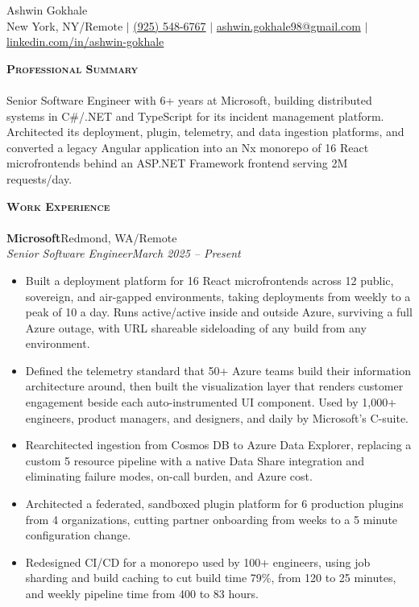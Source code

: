 \documentclass[letterpaper, 10pt]{article}
\newcommand{\lineunder}{
    \vspace*{-8pt} \\
    \hspace*{-18pt} \hrulefill \\
}
\newcommand{\header}[1]{
    \vspace*{10pt}
    {
        \hspace*{-18pt}\vspace*{4pt}
        {\large\textbf{\textsc{#1}}}
    }
    \vspace*{-6pt} \lineunder
}
\newcommand{\contact}[2]{
    \vspace*{-32pt}
    \begin{center}
        {\Huge #1}
        \vspace*{5pt}
        \\
        #2
    \end{center}
    \vspace*{-10pt}
}
\newcommand{\company}[2]{
    \textbf{#1}\hfill #2\\[0pt]
}
\newcommand{\role}[2]{
    \Needspace{5\baselineskip}
    \textit{#1}\hfill \textit{#2}\\[-2pt]
}
\begin{document}
\contact{Ashwin Gokhale}{
    New York, NY/Remote $\vert$
    \href{tel:+19255486767}{(925) 548-6767} $\vert$
    \href{mailto:ashwin.gokhale98@gmail.com}{ashwin.gokhale98@gmail.com} $\vert$
    \href{https://www.linkedin.com/in/ashwin-gokhale/}{linkedin.com/in/ashwin-gokhale}
}

\header{Professional Summary}
Senior Software Engineer with 6+ years at Microsoft, building distributed systems in C\#/.NET and TypeScript for its incident management platform. Architected its deployment, plugin, telemetry, and data ingestion platforms, and converted a legacy Angular application into an Nx monorepo of 16 React microfrontends behind an ASP.NET Framework frontend serving 2M requests/day.

\header{Work Experience}
\company{Microsoft}{Redmond, WA/Remote}
\role{Senior Software Engineer}{March 2025 -- Present}
\begin{itemize}
    \item Built a deployment platform for 16 React microfrontends across 12 public, sovereign, and air-gapped environments, taking deployments from weekly to a peak of 10 a day. Runs active/active inside and outside Azure, surviving a full Azure outage, with URL shareable sideloading of any build from any environment.
    \item Defined the telemetry standard that 50+ Azure teams build their information architecture around, then built the visualization layer that renders customer engagement beside each auto-instrumented UI component. Used by 1,000+ engineers, product managers, and designers, and daily by Microsoft's C-suite.
    \item Rearchitected ingestion from Cosmos DB to Azure Data Explorer, replacing a custom 5 resource pipeline with a native Data Share integration and eliminating failure modes, on-call burden, and Azure cost.
    \item Architected a federated, sandboxed plugin platform for 6 production plugins from 4 organizations, cutting partner onboarding from weeks to a 5 minute configuration change.
    \item Redesigned CI/CD for a monorepo used by 100+ engineers, using job sharding and build caching to cut build time 79\%, from 120 to 25 minutes, and weekly pipeline time from 400 to 83 hours.
\end{itemize}
\end{document}
